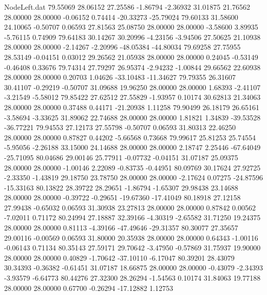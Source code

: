 \begin{filecontents}{NodeLeft.dat}
  79.55069   28.06152   27.25586    -1.86794   -2.36932   31.01875   21.76562   28.00000   28.00000   -0.06152    0.74414  -20.33273  -25.79024
  79.60133   31.58600   24.10065    -0.50707    0.06593   27.81563   25.08750   28.00000   28.00000   -3.58600    3.89935   -5.76115    0.74909
  79.64183   30.14267   30.20996    -4.23156   -3.94506   27.50625   21.10938   28.00000   28.00000   -2.14267   -2.20996  -48.05384  -44.80034
  79.69258   27.75955   28.53149    -0.04151    0.03012   29.26562   21.05938   28.00000   28.00000    0.24045   -0.53149   -0.46408    0.33676
  79.74314   27.79297   26.95374    -2.94232   -1.00844   29.66562   22.60938   28.00000   28.00000    0.20703    1.04626  -33.10483  -11.34627
  79.79355   26.31607   30.41107    -0.29219   -0.50707   31.09688   19.96250   28.00000   28.00000    1.68393   -2.41107   -3.21549   -5.58012
  79.85422   27.62512   27.55829    -1.93957    0.10174   30.62813   21.34063   28.00000   28.00000    0.37488    0.44171  -21.20938    1.11258
  79.90499   26.18179   26.65161    -3.58694   -3.33625   31.89062   22.74688   28.00000   28.00000    1.81821    1.34839  -39.53528  -36.77221
  79.94553   27.12173   27.55798    -0.50707    0.06593   31.80313   22.46250   28.00000   28.00000    0.87827    0.44202   -5.66568    0.73668
  79.99617   25.81253   25.74554    -5.95056   -2.26188   33.15000   24.14688   28.00000   28.00000    2.18747    2.25446  -67.64049  -25.71095
  80.04686   29.00146   25.77911    -0.07732   -0.04151   31.07187   25.09375   28.00000   28.00000   -1.00146    2.22089   -0.83735   -0.44951
  80.09769   30.17624   27.92725    -2.33350   -1.43819   29.18750   23.78750   28.00000   28.00000   -2.17624    0.07275  -24.87596  -15.33163
  80.13822   28.39722   28.29651    -1.86794   -1.65307   29.98438   23.14688   28.00000   28.00000   -0.39722   -0.29651  -19.67360  -17.41049
  80.18918   27.12158   27.99438    -0.65032    0.06593   31.30938   23.27813   28.00000   28.00000    0.87842    0.00562   -7.02011    0.71172
  80.24994   27.18887   32.39166    -4.30319   -2.65582   31.71250   19.24375   28.00000   28.00000    0.81113   -4.39166  -47.49646  -29.31357
  80.30077   27.35657   29.00116    -0.00569    0.06593   31.80000   20.35938   28.00000   28.00000    0.64343   -1.00116   -0.06143    0.71134
  80.35143   27.59171   29.70642    -3.47950   -0.57869   31.75937   19.90000   28.00000   28.00000    0.40829   -1.70642  -37.10110   -6.17047
  80.39201   28.43079   30.34393    -0.36382   -0.61451   31.07187   18.66875   28.00000   28.00000   -0.43079   -2.34393   -3.93579   -6.64773
  80.44276   27.32300   28.26294    -1.54563    0.10174   31.84063   19.77188   28.00000   28.00000    0.67700   -0.26294  -17.12882    1.12753

\end{filecontents}
